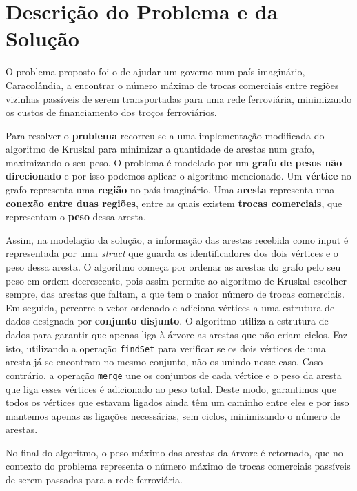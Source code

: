 \documentclass[12pt,a4paper]{article}
\begin{document}
  \section{Descrição do Problema e da Solução}

  O problema proposto foi o de ajudar um governo num país imaginário, Caracolândia, a encontrar o número máximo de trocas comerciais entre regiões vizinhas passíveis de serem transportadas para uma rede ferroviária, minimizando os custos de financiamento dos troços ferroviários.

  Para resolver o \textbf{problema} recorreu-se a uma implementação modificada do algoritmo de Kruskal para minimizar a quantidade de arestas num grafo, maximizando o seu peso.
  O problema é modelado por um \textbf{grafo de pesos não direcionado} e por isso podemos aplicar o algoritmo mencionado.
  Um \textbf{vértice} no grafo representa uma \textbf{região} no país imaginário.
  Uma \textbf{aresta} representa uma \textbf{conexão entre duas regiões}, entre as quais existem \textbf{trocas comerciais}, que representam o \textbf{peso} dessa aresta.

  Assim, na modelação da solução, a informação das arestas recebida como input é representada por uma \textit{struct} que guarda os identificadores dos dois vértices e o peso dessa aresta.
  O algoritmo começa por ordenar as arestas do grafo pelo seu peso em ordem decrescente, pois assim permite ao algoritmo de Kruskal escolher sempre, das arestas que faltam, a que tem o maior número de trocas comerciais.
  Em seguida, percorre o vetor ordenado e adiciona vértices a uma estrutura de dados designada por \textbf{conjunto disjunto}.
  O algoritmo utiliza a estrutura de dados para garantir que apenas liga à árvore as arestas que não criam ciclos.
  Faz isto, utilizando a operação \texttt{findSet} para verificar se os dois vértices de uma aresta já se encontram no mesmo conjunto, não os unindo nesse caso.
  Caso contrário, a operação \texttt{merge} une os conjuntos de cada vértice e o peso da aresta que liga esses vértices é adicionado ao peso total.
  Deste modo, garantimos que todos os vértices que estavam ligados ainda têm um caminho entre eles e por isso mantemos apenas as ligações necessárias, sem ciclos, minimizando o número de arestas.

  No final do algoritmo, o peso máximo das arestas da árvore é retornado, que no contexto do problema representa o número máximo de trocas comerciais passíveis de serem passadas para a rede ferroviária.
\end{document}
